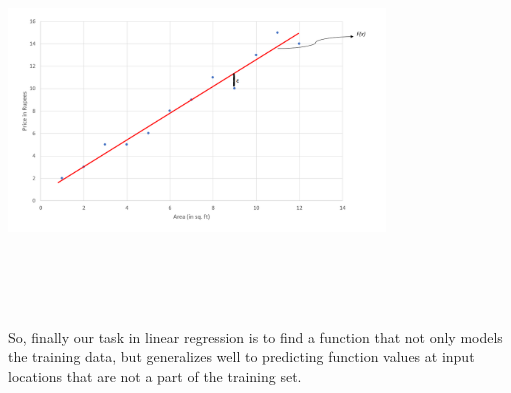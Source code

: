 \documentclass[12pt]{article}
\numberwithin{equation}{section}
\begin{document}
\begin{center}
	\includegraphics[width=10cm, height=10cm]{graph2}
\end{center}
So, finally our task in linear regression is to find a function that not only models the training data, but generalizes well to predicting function values at input locations that are not a part of the training set.
\end{document}
